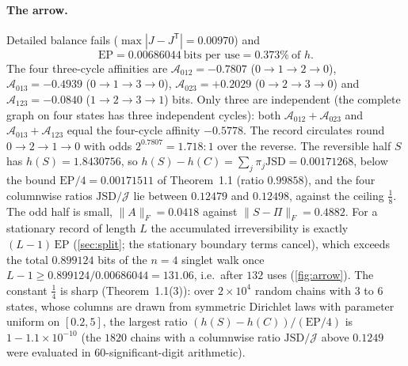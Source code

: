 \documentclass[11pt]{article}
\theoremstyle{definition}\newtheorem{definition}[theorem]{Definition}
\theoremstyle{remark}\newtheorem{remark}[theorem]{Remark}
\begin{document}
\paragraph{The arrow.} Detailed balance fails ($\max|J-J^{\mathsf T}|=0.00970$) and
\[
\mathrm{EP}=0.00686044\ \text{bits per use}=0.373\%\ \text{of }h .
\]
The four three-cycle affinities are $\mathcal A_{012}=-0.7807$ ($0\to1\to2\to0$), $\mathcal A_{013}=-0.4939$ ($0\to1\to3\to0$), $\mathcal A_{023}=+0.2029$ ($0\to2\to3\to0$) and $\mathcal A_{123}=-0.0840$ ($1\to2\to3\to1$) bits. Only three are independent (the complete graph on four states has three independent cycles): both $\mathcal A_{012}+\mathcal A_{023}$ and $\mathcal A_{013}+\mathcal A_{123}$ equal the four-cycle affinity $-0.5778$. The record circulates round $0\to2\to1\to0$ with odds $2^{0.7807}=1.718:1$ over the reverse. The reversible half $S$ has $h(S)=1.8430756$, so $h(S)-h(C)=\sum_j\pi_j\mathrm{JSD}=0.00171268$, below the bound $\mathrm{EP}/4=0.00171511$ of Theorem~1.1 (ratio $0.99858$), and the four columnwise ratios $\mathrm{JSD}/\mathcal J$ lie between $0.12479$ and $0.12498$, against the ceiling $\frac18$. The odd half is small, $\|A\|_F=0.0418$ against $\|S-\Pi\|_F=0.4882$. For a stationary record of length $L$ the accumulated irreversibility is exactly $(L-1)\,\mathrm{EP}$ (\cref{sec:split}; the stationary boundary terms cancel), which exceeds the total $0.899124$ bits of the $n=4$ singlet walk once $L-1\ge0.899124/0.00686044=131.06$, i.e.\ after $132$ uses (\cref{fig:arrow}). The constant $\frac14$ is sharp (Theorem~1.1(3)): over $2\times10^4$ random chains with $3$ to $6$ states, whose columns are drawn from symmetric Dirichlet laws with parameter uniform on $[0.2,5]$, the largest ratio $(h(S)-h(C))/(\mathrm{EP}/4)$ is $1-1.1\times10^{-10}$ (the $1820$ chains with a columnwise ratio $\mathrm{JSD}/\mathcal J$ above $0.1249$ were evaluated in 60-significant-digit arithmetic).
\end{document}
